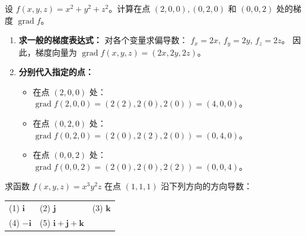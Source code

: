 \documentclass[lang=cn,11pt]{elegantbook}
\begin{document}
\begin{exercise}[三元函数的梯度]
设 $f(x,y,z)=x^2+y^2+z^2$。计算在点 $(2,0,0),(0,2,0)$ 和 $(0,0,2)$ 处的梯度 $\operatorname{grad}f$。
\end{exercise}

\begin{solution}
\begin{enumerate}
  \item \textbf{求一般的梯度表达式：}
  对各个变量求偏导数：
  $f_x = 2x$, $f_y = 2y$, $f_z = 2z$。
  因此，梯度向量为 $\operatorname{grad}f(x,y,z) = (2x, 2y, 2z)$。

  \item \textbf{分别代入指定的点：}
  \begin{itemize}
    \item 在点 $(2,0,0)$ 处：$\operatorname{grad}f(2,0,0) = (2(2), 2(0), 2(0)) = (4, 0, 0)$。
    \item 在点 $(0,2,0)$ 处：$\operatorname{grad}f(0,2,0) = (2(0), 2(2), 2(0)) = (0, 4, 0)$。
    \item 在点 $(0,0,2)$ 处：$\operatorname{grad}f(0,0,2) = (2(0), 2(0), 2(2)) = (0, 0, 4)$。
  \end{itemize}
\end{enumerate}
\end{solution}

\begin{exercise}[三元函数在多个方向的方向导数]
求函数 $f(x,y,z)=x^3y^2z$ 在点 $(1,1,1)$ 沿下列方向的方向导数：
\begin{tabular}{p{} p{} p{}}
(1) $\boldsymbol{i}$ & (2) $\boldsymbol{j}$ & (3) $\boldsymbol{k}$ \\
(4) $-\boldsymbol{i}$ & (5) $\boldsymbol{i}+\boldsymbol{j}+\boldsymbol{k}$ &
\end{tabular}
\end{exercise}
\end{document}
